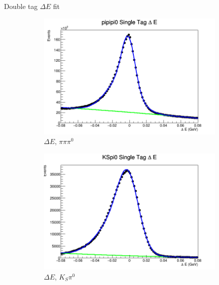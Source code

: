 \documentclass{beamer}
\begin{document}
\begin{frame}{Double tag $\Delta E$ fit}
  \begin{figure}
    \centering
    \begin{subfigure}{0.4\textwidth}
      \centering
      \includegraphics[width=\textwidth]{pipipi0DeltaE.png}
      \caption{$\Delta E$, $\pi\pi\pi^0$}
    \end{subfigure}%
    \begin{subfigure}{0.4\textwidth}
      \centering
      \includegraphics[width=\textwidth]{KSpi0DeltaE.png}
      \caption{$\Delta E$, $K_S\pi^0$}
    \end{subfigure}
    \begin{subfigure}{0.4\textwidth}
      \centering

\end{subfigure}
\end{figure}
\end{frame}
\end{document}
